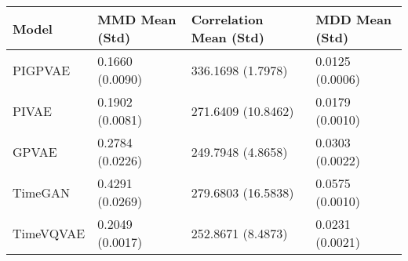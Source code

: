 \begin{tabular}{llll}
\toprule
Model & MMD Mean (Std) & Correlation Mean (Std) & MDD Mean (Std) \\
\midrule
PIGPVAE & 0.1660 (0.0090) & 336.1698 (1.7978) & 0.0125 (0.0006) \\
PIVAE & 0.1902 (0.0081) & 271.6409 (10.8462) & 0.0179 (0.0010) \\
GPVAE & 0.2784 (0.0226) & 249.7948 (4.8658) & 0.0303 (0.0022) \\
TimeGAN & 0.4291 (0.0269) & 279.6803 (16.5838) & 0.0575 (0.0010) \\
TimeVQVAE & 0.2049 (0.0017) & 252.8671 (8.4873) & 0.0231 (0.0021) \\
\bottomrule
\end{tabular}
